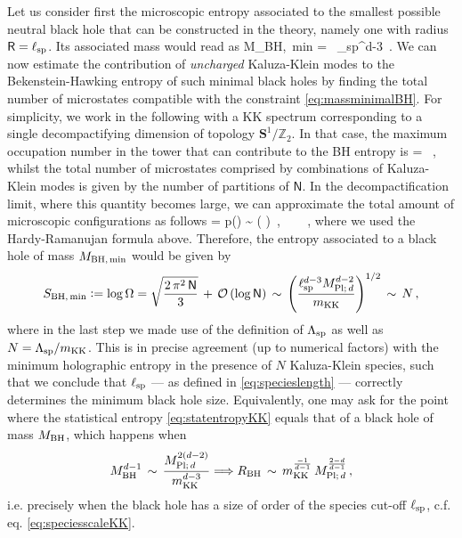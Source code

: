 Let us consider first the microscopic entropy associated to the smallest possible neutral black hole that can be constructed in the theory, namely one with radius $\mathsf{R}= \ell_{\rm sp}$. Its associated mass would read as
%
\beq\label{eq:massminimalBH}
	M_{\rm BH,\, min} = \, \ell_{\rm sp}^{d-3}\, .
\eeq
%
We can now estimate the contribution of \emph{uncharged} Kaluza-Klein modes to the Bekenstein-Hawking entropy of such minimal black holes by finding the total number of microstates compatible with the constraint \eqref{eq:massminimalBH}. For simplicity, we work in the following with a KK spectrum corresponding to a single decompactifying dimension of topology $\mathbf{S}^1/\mathbb{Z}_2$. In that case, the maximum occupation number in the tower that can contribute to the BH entropy is
%
\beq
	= \, ,
\eeq
%
whilst the total number of microstates comprised by combinations of Kaluza-Klein modes is given by the number of partitions of $\mathsf{N}$. In the decompactification limit, where this quantity becomes large, we can approximate the total amount of microscopic configurations as follows
%
\beq
	\Omega = p() \sim {} \exp \left(  \right)\, , \qquad {}\ \  \, ,
\eeq
%
where we used the Hardy-Ramanujan formula above. Therefore, the entropy associated to a black hole of mass $M_{\rm BH,\, min}$ would be given by 
%
\begin{align}\label{eq:statentropyKK}
	S_{\rm BH,\, min} := \log \Omega = \sqrt{\frac{2\, \pi^2\, \mathsf{N}}{3}}\, +\, \mathcal{O} \left(\log \mathsf{N}\right)\, \sim\, \left( \frac{\ell_{\rm sp}^{d-3} M_{\text{Pl;}\, d}^{d-2}}{m_{\text{KK}}}\right)^{1/2}\, \sim\, N\, ,
\end{align}
%
where in the last step we made use of the definition of $\Lambda_{\text{sp}}$ as well as $N= \Lambda_{\text{sp}}/m_{\text{KK}}$. This is in precise agreement (up to numerical factors) with the minimum holographic entropy in the presence of $N$ Kaluza-Klein species, such that we conclude that $\ell_{\rm sp}$ --- as defined in \eqref{eq:specieslength} --- correctly determines the minimum black hole size. Equivalently, one may ask for the point where the statistical entropy \eqref{eq:statentropyKK} equals that of a black hole of mass $M_{\rm BH}$, which happens when 
%
\begin{align}\label{eq:transitionpointBHtoKK}
	M_{\rm BH}^{d-1}\, \sim\, \frac{M_{\text{Pl;}\, d}^{2(d-2)}}{m_{\rm KK}^{d-3}} \Longrightarrow R_{\rm BH}\, \sim\, m_{\rm KK}^{\frac{-1}{d-1}}\, M_{\text{Pl;}\, d}^{\frac{2-d}{d-1}}\, ,
\end{align}
%
i.e. precisely when the black hole has a size of order of the species cut-off $\ell_{\rm sp}$, c.f. eq. \eqref{eq:speciesscaleKK}.

